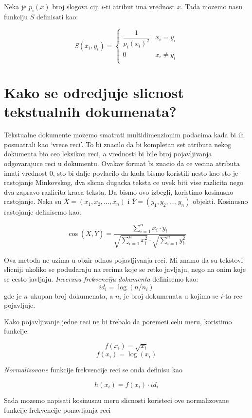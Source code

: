 \documentclass[a4paper]{article}
\begin{document}
 Neka je \(p_i(x)\) broj slogova ciji \(i\)-ti atribut ima vrednost \(x\). Tada mozemo nasu funkciju
 \(S\) definisati kao:

 \[
    S(x_i, y_i) =
    \begin{cases}
        \dfrac{1}{p_i(x_i)^2} & x_i = y_i \\
        0 & x_i \neq y_i \\
    \end{cases}
 \]

\section{Kako se odredjuje slicnost tekstualnih dokumenata?}
\label{pitanje:slicnost_tekst_dokumenata}

Tekstualne dokumente mozemo smatrati multidimenzionim podacima kada bi ih posmatrali kao `vrece
reci'. To bi znacilo da bi kompletan set atributa nekog dokumenta bio ceo leksikon reci, a vrednosti
bi bile broj pojavljivanja odgovarajuce reci u dokumentu. Ovakav format bi znacio da ce vecina
atributa imati vrednost 0, sto bi dalje povlacilo da kada bismo koristili nesto kao sto je
rastojanje Minkovskog, dva slicna dugacka teksta ce uvek biti vise razlicita nego dva zapravo
razlicita kraca teksta. Da bismo ovo izbegli, koristimo kosinusno rastojanje. Neka su
\(\overline{X}=(x_1,x_2,\ldots,x_n)\) i \(\overline{Y}=(y_1,y_2,\ldots,y_n)\) objekti. Kosinusno
rastojanje definisemo kao:

\[
    \cos(\overline{X}, \overline{Y}) =
    \dfrac{\sum_{i=1}^{n} x_i \cdot y_i}{\sqrt{\sum_{i=1}^{n} x_i^2} \cdot \sqrt{\sum_{i=1}^{n} y_i^2}}
\]

Ova metoda ne uzima u obzir odnos pojavljivanja reci. Mi znamo da su tekstovi slicniji ukoliko se
podudaraju na recima koje se retko javljaju, nego na onim koje se cesto javljaju. \emph{Inverznu
frekvenciju dokumenta} definisemo kao:
\[id_i = \log(n/n_i)\]
gde je \(n\) ukupan broj dokumenata, a \(n_i\) je broj dokumenata u kojima se \(i\)-ta rec
pojavljuje.

Kako pojavljivanje jedne reci ne bi trebalo da poremeti celu meru, koristimo funkcije:

\[f(x_i) = \sqrt{x_i}\]
\[f(x_i) = \log(x_i)\]

\emph{Normalizovane} funkcije frekvencije reci se onda definisu kao

\[h(x_i) = f(x_i) \cdot id_i\]

Sada mozemo napisati kosinusnu meru slicnosti koristeci ove normalizovane funkcije frekvencije
ponavljanja reci
\end{document}
